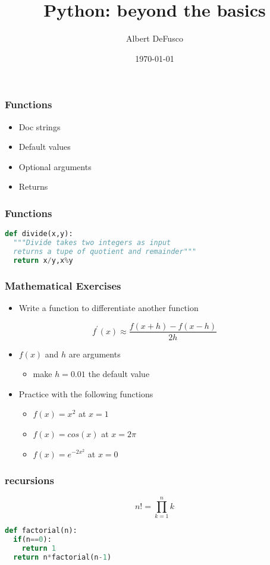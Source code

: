 \documentclass[xcolor=table,10pt,final]{beamer}
\begin{document}
\title{Python: beyond the basics}
\author{Albert DeFusco}
\date{\today}


\frame{\titlepage}

\begin{frame}
  \frametitle{Functions}
  \begin{itemize}
    \item Doc strings
    \item Default values
    \item Optional arguments
    \item Returns
  \end{itemize}
\end{frame}

\begin{frame}[fragile]
  \frametitle{Functions}
\begin{lstlisting}[language=Python]
def divide(x,y):
  """Divide takes two integers as input
  returns a tupe of quotient and remainder"""
  return x/y,x%y
\end{lstlisting}
\end{frame}

\begin{frame}
  \frametitle{Mathematical Exercises}
  \begin{itemize}
    \item Write a function to differentiate another function
  \end{itemize}
\begin{equation*}
  f^{\prime}(x) \approx \frac{f(x+h) - f(x-h)}{2h}
\end{equation*}
\begin{itemize}
  \item<2-> $f(x)$ and $h$ are arguments
    \begin{itemize}
      \item make $h=0.01$ the default value
    \end{itemize}
  \item<2-> Practice with the following functions
    \begin{itemize}
      \item $f(x) = x^2$ at $x=1$
      \item $f(x) = cos(x)$ at $x=2\pi$
      \item $f(x) = e^{-2x^2}$ at $x=0$
    \end{itemize}
\end{itemize}
\end{frame}

\begin{frame}[fragile]
  \frametitle{recursions}
  \begin{equation*}
    n! = \prod_{k=1}^n k
  \end{equation*}
\begin{lstlisting}[language=Python]
def factorial(n):
  if(n==0):
    return 1
  return n*factorial(n-1)
\end{lstlisting}
\end{frame}
\end{document}
